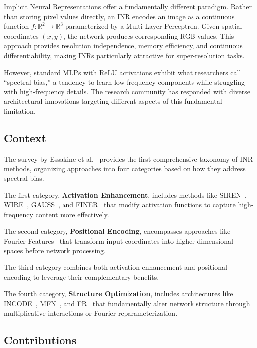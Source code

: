 \documentclass[a4paper,oneside,10pt,ngerman,english]{scrartcl}
\begin{document}
Implicit Neural Representations offer a fundamentally different paradigm. Rather than storing pixel values directly, an INR encodes an image as a continuous function $f: \mathbb{R}^2 \to \mathbb{R}^3$ parameterized by a Multi-Layer Perceptron. Given spatial coordinates $(x, y)$, the network produces corresponding RGB values. This approach provides resolution independence, memory efficiency, and continuous differentiability, making INRs particularly attractive for super-resolution tasks.

However, standard MLPs with ReLU activations exhibit what researchers call ``spectral bias,'' a tendency to learn low-frequency components while struggling with high-frequency details. The research community has responded with diverse architectural innovations targeting different aspects of this fundamental limitation.

\subsection{Context}

The survey by Essakine et al.~\cite{essakine2024survey} provides the first comprehensive taxonomy of INR methods, organizing approaches into four categories based on how they address spectral bias.

The first category, \textbf{Activation Enhancement}, includes methods like SIREN~\cite{sitzmann2020siren}, WIRE~\cite{saragadam2023wire}, GAUSS~\cite{ramasinghe2022gauss}, and FINER~\cite{liu2024finer} that modify activation functions to capture high-frequency content more effectively.

The second category, \textbf{Positional Encoding}, encompasses approaches like Fourier Features~\cite{tancik2020fourier} that transform input coordinates into higher-dimensional spaces before network processing.

The third category combines both activation enhancement and positional encoding to leverage their complementary benefits.

The fourth category, \textbf{Structure Optimization}, includes architectures like INCODE~\cite{kazerouni2024incode}, MFN~\cite{fathony2021mfn}, and FR~\cite{shi2024fr} that fundamentally alter network structure through multiplicative interactions or Fourier reparameterization.

\subsection{Contributions}
\end{document}
